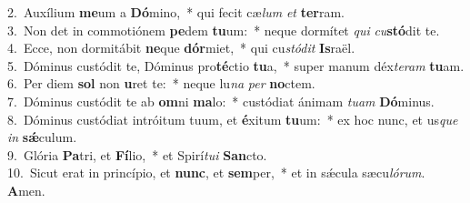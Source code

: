 {2.~}Auxílium \textbf{me}um a \textbf{Dó}mino,~* qui fecit cæ\textit{lum} \textit{et} \textbf{ter}ram.\\
{3.~}Non det in commotiónem \textbf{pe}dem \textbf{tu}um:~* neque dormítet \textit{qui} \textit{cu}\textbf{stó}dit te.\\
{4.~}Ecce, non dormitábit \textbf{ne}que \textbf{dór}miet,~* qui cu\textit{stó}\textit{dit} \textbf{Is}raël.\\
{5.~}Dóminus custódit te, Dóminus pro\textbf{té}ctio \textbf{tu}a,~* super manum déx\textit{te}\textit{ram} \textbf{tu}am.\\
{6.~}Per diem \textbf{sol} non \textbf{u}ret te:~* neque lu\textit{na} \textit{per} \textbf{no}ctem.\\
{7.~}Dóminus custódit te ab \textbf{om}ni \textbf{ma}lo:~* custódiat ánimam \textit{tu}\textit{am} \textbf{Dó}minus.\\
{8.~}Dóminus custódiat intróitum tuum, et \textbf{é}xitum \textbf{tu}um:~* ex hoc nunc, et us\textit{que} \textit{in} \textbf{sǽ}culum.\\
{9.~}Glória \textbf{Pa}tri, et \textbf{Fí}lio,~* et Spirí\textit{tu}\textit{i} \textbf{San}cto.\\
{10.~}Sicut erat in princípio, et \textbf{nunc}, et \textbf{sem}per,~* et in sǽcula sæcu\textit{ló}\textit{rum}. \textbf{A}men.\\
